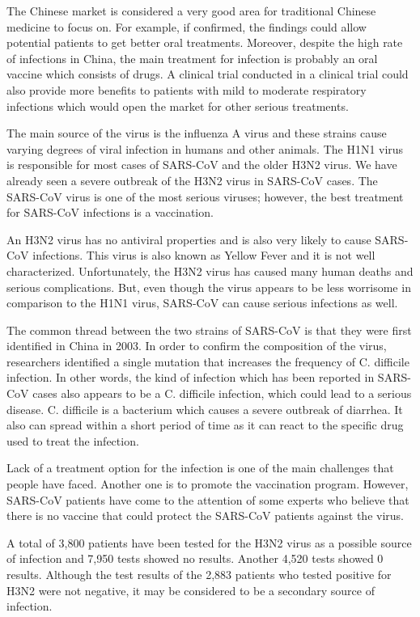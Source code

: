 \documentclass{article}
\begin{document}
The Chinese market is considered a very good area for traditional Chinese medicine to focus on. For example, if confirmed, the findings could allow potential patients to get better oral treatments. Moreover, despite the high rate of infections in China, the main treatment for infection is probably an oral vaccine which consists of drugs. A clinical trial conducted in a clinical trial could also provide more benefits to patients with mild to moderate respiratory infections which would open the market for other serious treatments.

The main source of the virus is the influenza A virus and these strains cause varying degrees of viral infection in humans and other animals. The H1N1 virus is responsible for most cases of SARS-CoV and the older H3N2 virus. We have already seen a severe outbreak of the H3N2 virus in SARS-CoV cases. The SARS-CoV virus is one of the most serious viruses; however, the best treatment for SARS-CoV infections is a vaccination.

An H3N2 virus has no antiviral properties and is also very likely to cause SARS-CoV infections. This virus is also known as Yellow Fever and it is not well characterized. Unfortunately, the H3N2 virus has caused many human deaths and serious complications. But, even though the virus appears to be less worrisome in comparison to the H1N1 virus, SARS-CoV can cause serious infections as well.

The common thread between the two strains of SARS-CoV is that they were first identified in China in 2003. In order to confirm the composition of the virus, researchers identified a single mutation that increases the frequency of C. difficile infection. In other words, the kind of infection which has been reported in SARS-CoV cases also appears to be a C. difficile infection, which could lead to a serious disease. C. difficile is a bacterium which causes a severe outbreak of diarrhea. It also can spread within a short period of time as it can react to the specific drug used to treat the infection.

Lack of a treatment option for the infection is one of the main challenges that people have faced. Another one is to promote the vaccination program. However, SARS-CoV patients have come to the attention of some experts who believe that there is no vaccine that could protect the SARS-CoV patients against the virus.

A total of 3,800 patients have been tested for the H3N2 virus as a possible source of infection and 7,950 tests showed no results. Another 4,520 tests showed 0 results. Although the test results of the 2,883 patients who tested positive for H3N2 were not negative, it may be considered to be a secondary source of infection.
\end{document}
